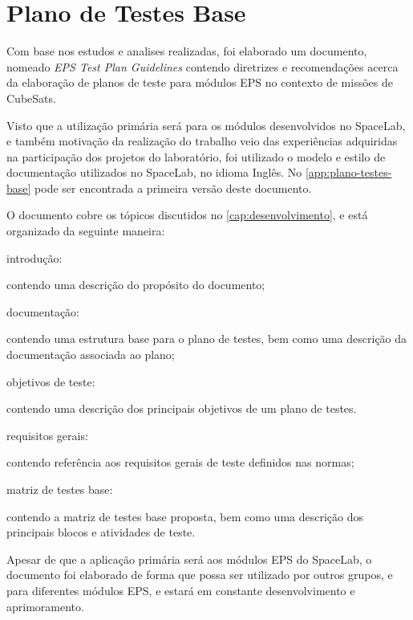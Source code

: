 \chapter{Plano de Testes Base}

Com base nos estudos e analises realizadas, foi elaborado um documento, nomeado \textit{EPS Test Plan Guidelines} contendo diretrizes e recomendações acerca da elaboração de planos de teste para módulos \gls{EPS} no contexto de missões de CubeSats.

Visto que a utilização primária será para os módulos desenvolvidos no SpaceLab, e também motivação da realização do trabalho veio das experiências adquiridas na participação dos projetos do laboratório, foi utilizado o modelo e estilo de documentação utilizados no SpaceLab, no idioma Inglês.
No \autoref{app:plano-testes-base} pode ser encontrada a primeira versão deste documento.

O documento cobre os tópicos discutidos no \autoref{cap:desenvolvimento}, e está organizado da seguinte maneira:

\begin{alineas}
    \item introdução:
    \begin{alineas}
        \item contendo uma descrição do propósito do documento;
    \end{alineas}

    \item documentação:
    \begin{alineas}
        \item contendo uma estrutura base para o plano de testes, bem como uma descrição da documentação associada ao plano;
    \end{alineas}

    \item objetivos de teste:
    \begin{alineas}
        \item contendo uma descrição dos principais objetivos de um plano de testes.
    \end{alineas}

    \item requisitos gerais:
    \begin{alineas}
        \item contendo referência aos requisitos gerais de teste definidos nas normas;
    \end{alineas}

    \item matriz de testes base:
    \begin{alineas}
        \item contendo a matriz de testes base proposta, bem como uma descrição dos principais blocos e atividades de teste.
    \end{alineas}

\end{alineas}


Apesar de que a aplicação primária será aos módulos \gls{EPS} do SpaceLab, o documento foi elaborado de forma que possa ser utilizado por outros grupos, e para diferentes módulos \gls{EPS}, e estará em constante desenvolvimento e aprimoramento.